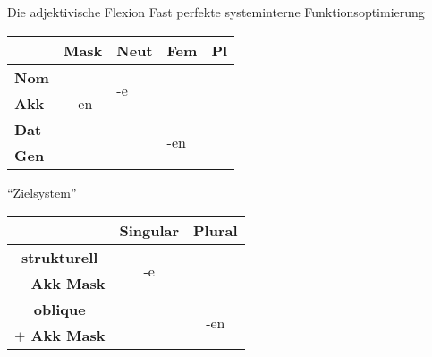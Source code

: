 \begin{frame}
  {Die adjektivische Flexion}
  \pause
  Fast perfekte systeminterne Funktionsoptimierung\\
  \Zeile
  \pause
  \begin{center}
    \begin{tabular}{|l|llll|}
      \cline{2-5}
      \multicolumn{1}{c|}{}& \textbf{Mask} & \textbf{Neut} & \textbf{Fem} & \textbf{Pl} \\
      \hline
      \textbf{Nom} && \multirow{2}{*}{-e} & \multicolumn{1}{c|}{} & \\ \cline{2-2}
      \textbf{Akk} & \multicolumn{1}{c|}{-en} && \multicolumn{1}{c|}{} & \\ \cline{2-4}
      \textbf{Dat} &&& \multirow{2}{*}{-en} & \\
      \textbf{Gen} &&&& \\
      \hline
    \end{tabular}
  \end{center}
  \pause
  "`Zielsystem"'\\
  \begin{center}
    \begin{tabular}{|l|c|c|}
      \cline{2-3}
      \multicolumn{1}{c|}{} & \multicolumn{1}{c|}{\textbf{Singular}} & \multicolumn{1}{c|}{\textbf{Plural}} \\
      \hline
      \multicolumn{1}{|c|}{\textbf{strukturell}} & \multirow{2}{*}{-e} &  \\
      \multicolumn{1}{|c|}{\textbf{$-$ Akk Mask}} &  &  \\
      \cline{1-2}
      \multicolumn{1}{|c|}{\textbf{oblique}} & \multicolumn{1}{c}{} & \multirow{2}{*}{-en} \\
      \multicolumn{1}{|c|}{\textbf{$+$ Akk Mask}} & \multicolumn{1}{c}{} & \\
      \hline
    \end{tabular}
  \end{center}
\end{frame}


